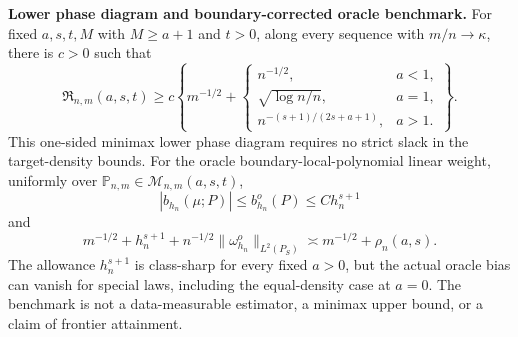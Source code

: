 \textbf{Lower phase diagram and boundary-corrected oracle benchmark.}
For fixed \(a,s,t,M\) with \(M\ge a+1\) and \(t>0\), along every sequence with \(m/n\to\kappa\), there is \(c>0\) such that
\[
\mathfrak R_{n,m}(a,s,t)\ge c\left\{m^{-1/2}+\begin{cases}
n^{-1/2},&a<1,\\
\sqrt{\log n/n},&a=1,\\
n^{-(s+1)/(2s+a+1)},&a>1.
\end{cases}\right\}.
\]
This one-sided minimax lower phase diagram requires no strict slack in the target-density bounds. For the oracle boundary-local-polynomial linear weight, uniformly over \(\mathbb P_{n,m}\in\mathcal M_{n,m}(a,s,t)\),
\[
|b_{h_n}(\mu;P)|\le b_{h_n}^o(P)\le C h_n^{s+1}
\]
and
\[
m^{-1/2}+h_n^{s+1}
+n^{-1/2}\|\omega_{h_n}^o\|_{L^2(P_S)}
\asymp m^{-1/2}+\rho_n(a,s).
\]
The allowance \(h_n^{s+1}\) is class-sharp for every fixed \(a>0\), but the actual oracle bias can vanish for special laws, including the equal-density case at \(a=0\). The benchmark is not a data-measurable estimator, a minimax upper bound, or a claim of frontier attainment.